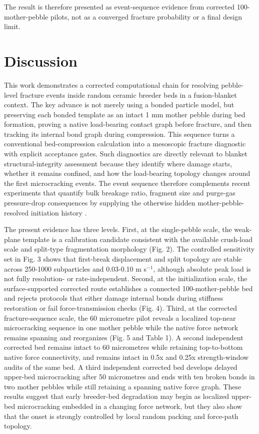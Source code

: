 \documentclass[5p,twocolumn]{elsarticle}
\begin{document}
The result is therefore presented as event-sequence evidence from corrected 100-mother-pebble pilots, not as a converged fracture probability or a final design limit.


\section{Discussion}

This work demonstrates a corrected computational chain for resolving pebble-level fracture events inside random ceramic breeder beds in a fusion-blanket context. The key advance is not merely using a bonded particle model, but preserving each bonded template as an intact 1 mm mother pebble during bed formation, proving a native load-bearing contact graph before fracture, and then tracking its internal bond graph during compression. This sequence turns a conventional bed-compression calculation into a mesoscopic fracture diagnostic with explicit acceptance gates. Such diagnostics are directly relevant to blanket structural-integrity assessment because they identify where damage starts, whether it remains confined, and how the load-bearing topology changes around the first microcracking events. The event sequence therefore complements recent experiments that quantify bulk breakage ratio, fragment size and purge-gas pressure-drop consequences by supplying the otherwise hidden mother-pebble-resolved initiation history \cite{Fang2026Li4SiO4BedCrushing}.


The present evidence has three levels. First, at the single-pebble scale, the weak-plane template is a calibration candidate consistent with the available crush-load scale and split-type fragmentation morphology (Fig. 2). The controlled sensitivity set in Fig. 3 shows that first-break displacement and split topology are stable across 250-1000 subparticles and 0.03-0.10 m s$^{-1}$, although absolute peak load is not fully resolution- or rate-independent. Second, at the initialization scale, the surface-supported corrected route establishes a connected 100-mother-pebble bed and rejects protocols that either damage internal bonds during stiffness restoration or fail force-transmission checks (Fig. 4). Third, at the corrected fracture-sequence scale, the 60 micrometre pilot reveals a localized top-near microcracking sequence in one mother pebble while the native force network remains spanning and reorganizes (Fig. 5 and Table 1). A second independent corrected bed remains intact to 60 micrometres while retaining top-to-bottom native force connectivity, and remains intact in 0.5x and 0.25x strength-window audits of the same bed. A third independent corrected bed develops delayed upper-bed microcracking after 50 micrometres and ends with ten broken bonds in two mother pebbles while still retaining a spanning native force graph. These results suggest that early breeder-bed degradation may begin as localized upper-bed microcracking embedded in a changing force network, but they also show that the onset is strongly controlled by local random packing and force-path topology.
\end{document}
